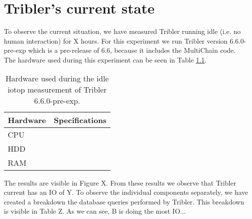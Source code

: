 \chapter{Tribler's current state}

To observe the current situation, we have measured Tribler running idle (i.e. no human interaction) for X hours.
For this experiment we run Tribler version 6.6.0-pre-exp which is a pre-release of 6.6, because it includes the MultiChain code.
The hardware used during this experiment can be seen in Table \ref{table:tribler_idle}.

\begin{table}[h]
	\centering
	\begin{tabular}{l|l}
Hardware	& Specifications \\ \hline
CPU			&  \\ 
HDD			&  \\ 
RAM			&  \\
	\end{tabular}
	\caption{Hardware used during the idle iotop measurement of Tribler 6.6.0-pre-exp.}
	\label{table:tribler_idle}
\end{table}

The results are visible in Figure X.
From these results we observe that Tribler current has an IO of Y.
To observe the individual components separately, we have created a breakdown the database queries performed by Tribler.
This breakdown is visible in Table Z.
As we can see, B is doing the most IO... 

